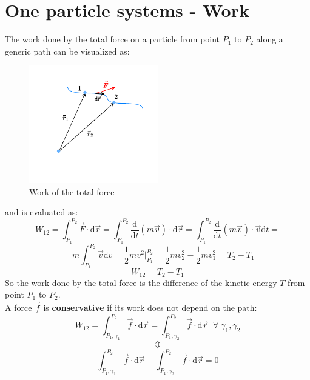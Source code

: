 \section{One particle systems - Work}
The work done by the total force on a particle from point $P_1$ to $P_2$ along a generic path can be visualized as:
\begin{figure}[H]
    \centering
    \includegraphics[width=0.5\textwidth]{res/svg/work.drawio}
    \caption{Work of the total force}
    \label{fig:image4}
\end{figure}
and is evaluated as:
\begin{equation}
    W_{12} = \int_{P_1}^{P_2}\vec{F}\cdot\mathrm{d}\vec{r} = \int_{P_1}^{P_2}\dfrac{\mathrm{d}}{\mathrm{d}t}(m\vec{v})\cdot\mathrm{d}\vec{r} = \int_{P_1}^{P_2}\dfrac{\mathrm{d}}{\mathrm{d}t}(m\vec{v})\cdot\vec{v}\mathrm{d}t =
\end{equation}
\begin{equation}
    = m\int_{P_1}^{P_2}\vec{v}\mathrm{d}v = \dfrac{1}{2}mv^2\bigg|_{P_1}^{P_2} = \dfrac{1}{2}mv_2^2 - \dfrac{1}{2}mv_1^2 = T_2 -T_1
\end{equation}
\begin{equation} \label{e:total_work}
    W_{12} = T_2 -T_1
\end{equation}
So the work done by the total force is the difference of the kinetic energy $T$ from point $P_1$ to $P_2$.\\
A force $\vec{f}$ is \textbf{conservative} if its work does not depend on the path:
\begin{equation}
    W_{12} = \int_{P_1,\gamma_1}^{P_2}\vec{f}\cdot\mathrm{d}\vec{r} = \int_{P_1,\gamma_2}^{P_2}\vec{f}\cdot\mathrm{d}\vec{r}\;\;\forall\;\gamma_1, \gamma_2
\end{equation}
\[\Updownarrow \]
\begin{equation}
    \int_{P_1,\gamma_1}^{P_2}\vec{f}\cdot\mathrm{d}\vec{r} - \int_{P_1,\gamma_2}^{P_2}\vec{f}\cdot\mathrm{d}\vec{r} = 0
\end{equation}
